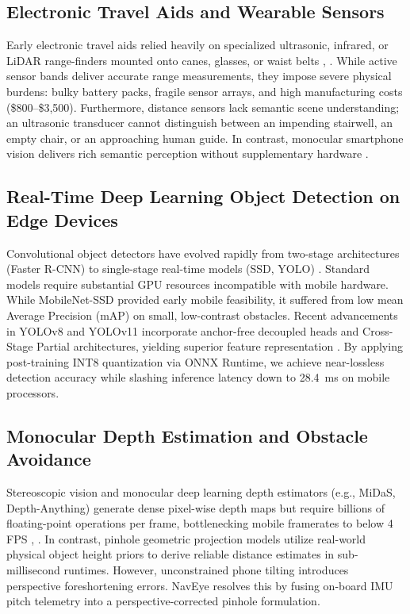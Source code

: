 \documentclass[conference]{IEEEtran}
\begin{document}
\subsection{Electronic Travel Aids and Wearable Sensors}
Early electronic travel aids relied heavily on specialized ultrasonic, infrared, or LiDAR range-finders mounted onto canes, glasses, or waist belts \cite{b3}, \cite{b8}. While active sensor bands deliver accurate range measurements, they impose severe physical burdens: bulky battery packs, fragile sensor arrays, and high manufacturing costs (\$800--\$3,500). Furthermore, distance sensors lack semantic scene understanding; an ultrasonic transducer cannot distinguish between an impending stairwell, an empty chair, or an approaching human guide. In contrast, monocular smartphone vision delivers rich semantic perception without supplementary hardware \cite{b4}.

\subsection{Real-Time Deep Learning Object Detection on Edge Devices}
Convolutional object detectors have evolved rapidly from two-stage architectures (Faster R-CNN) to single-stage real-time models (SSD, YOLO) \cite{b1}. Standard models require substantial GPU resources incompatible with mobile hardware. While MobileNet-SSD provided early mobile feasibility, it suffered from low mean Average Precision (mAP) on small, low-contrast obstacles. Recent advancements in YOLOv8 and YOLOv11 incorporate anchor-free decoupled heads and Cross-Stage Partial architectures, yielding superior feature representation \cite{b11}. By applying post-training INT8 quantization via ONNX Runtime, we achieve near-lossless detection accuracy while slashing inference latency down to 28.4~ms on mobile processors.

\subsection{Monocular Depth Estimation and Obstacle Avoidance}
Stereoscopic vision and monocular deep learning depth estimators (e.g., MiDaS, Depth-Anything) generate dense pixel-wise depth maps but require billions of floating-point operations per frame, bottlenecking mobile framerates to below 4 FPS \cite{b6}, \cite{b12}. In contrast, pinhole geometric projection models utilize real-world physical object height priors to derive reliable distance estimates in sub-millisecond runtimes. However, unconstrained phone tilting introduces perspective foreshortening errors. NavEye resolves this by fusing on-board IMU pitch telemetry into a perspective-corrected pinhole formulation.
\end{document}
